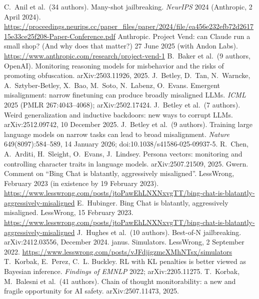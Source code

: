  C.~Anil et al.\ (34 authors). Many-shot jailbreaking. \emph{NeurIPS} 2024 (Anthropic, 2 April 2024). \url{https://proceedings.neurips.cc/paper_files/paper/2024/file/ea456e232efb72d261715e33ce25f208-Paper-Conference.pdf}
 Anthropic. Project Vend: can Claude run a small shop? (And why does that matter?) 27 June 2025 (with Andon Labs). \url{https://www.anthropic.com/research/project-vend-1}
 B.~Baker et al.\ (9 authors, OpenAI). Monitoring reasoning models for misbehavior and the risks of promoting obfuscation. arXiv:2503.11926, 2025.
 J.~Betley, D.~Tan, N.~Warncke, A.~Sztyber-Betley, X.~Bao, M.~Soto, N.~Labenz, O.~Evans. Emergent misalignment: narrow finetuning can produce broadly misaligned LLMs. \emph{ICML} 2025 (PMLR 267:4043--4068); arXiv:2502.17424.
 J.~Betley et al.\ (7 authors). Weird generalization and inductive backdoors: new ways to corrupt LLMs. arXiv:2512.09742, 10 December 2025.
 J.~Betley et al.\ (9 authors). Training large language models on narrow tasks can lead to broad misalignment. \emph{Nature} 649(8097):584--589, 14 January 2026; doi:10.1038/s41586-025-09937-5.
 R.~Chen, A.~Arditi, H.~Sleight, O.~Evans, J.~Lindsey. Persona vectors: monitoring and controlling character traits in language models. arXiv:2507.21509, 2025.
 Gwern. Comment on ``Bing Chat is blatantly, aggressively misaligned''. LessWrong, February 2023 (in existence by 19 February 2023). \url{https://www.lesswrong.com/posts/jtoPawEhLNXNxvgTT/bing-chat-is-blatantly-aggressively-misaligned}
 E.~Hubinger. Bing Chat is blatantly, aggressively misaligned. LessWrong, 15 February 2023. \url{https://www.lesswrong.com/posts/jtoPawEhLNXNxvgTT/bing-chat-is-blatantly-aggressively-misaligned}
 J.~Hughes et al.\ (10 authors). Best-of-N jailbreaking. arXiv:2412.03556, December 2024.
 janus. Simulators. LessWrong, 2 September 2022. \url{https://www.lesswrong.com/posts/vJFdjigzmcXMhNTsx/simulators}
 T.~Korbak, E.~Perez, C.~L. Buckley. RL with KL penalties is better viewed as Bayesian inference. \emph{Findings of EMNLP} 2022; arXiv:2205.11275.
 T.~Korbak, M.~Balesni et al.\ (41 authors). Chain of thought monitorability: a new and fragile opportunity for AI safety. arXiv:2507.11473, 2025.

